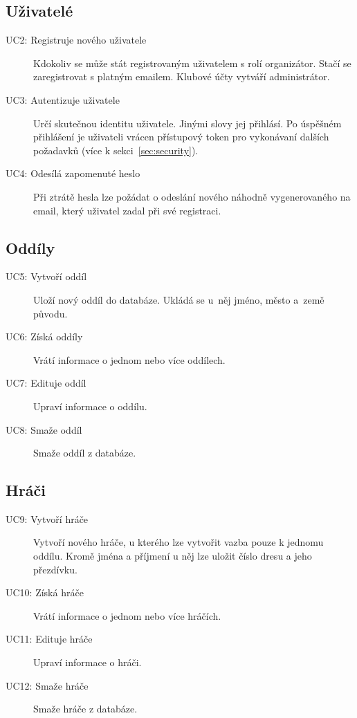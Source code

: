 \subsection*{Uživatelé}
  \begin{description}
    \item[UC2: Registruje nového uživatele]
      Kdokoliv se může stát registrovaným uživatelem s rolí organizátor. Stačí se zaregistrovat s platným emailem.
      Klubové účty vytváří administrátor.
    \item[UC3: Autentizuje uživatele]
      Určí skutečnou identitu uživatele. Jinými slovy jej přihlásí. Po úspěšném přihlášení je uživateli vrácen
      přístupový token pro vykonávaní dalších požadavků (více k sekci~\ref{sec:security}).
    \item[UC4: Odesílá zapomenuté heslo]
      Při ztrátě hesla lze požádat o odeslání nového náhodně vygenerovaného na email, který uživatel zadal při své registraci.
  \end{description}

\subsection*{Oddíly}
  \begin{description}
    \item[UC5: Vytvoří oddíl]
      Uloží nový oddíl do databáze. Ukládá se u~něj jméno, město a~země původu.
    \item[UC6: Získá oddíly]
      Vrátí informace o jednom nebo více oddílech.
    \item[UC7: Edituje oddíl]
      Upraví informace o oddílu.
    \item[UC8: Smaže oddíl]
      Smaže oddíl z databáze.
  \end{description}

\subsection*{Hráči}
  \begin{description}
    \item[UC9: Vytvoří hráče]
      Vytvoří nového hráče, u kterého lze vytvořit vazba pouze k jednomu oddílu.
      Kromě jména a příjmení u něj lze uložit číslo dresu a jeho přezdívku.
    \item[UC10: Získá hráče]
      Vrátí informace o jednom nebo více hráčích.
    \item[UC11: Edituje hráče]
      Upraví informace o hráči.
    \item[UC12: Smaže hráče]
      Smaže hráče z databáze.
  \end{description}

